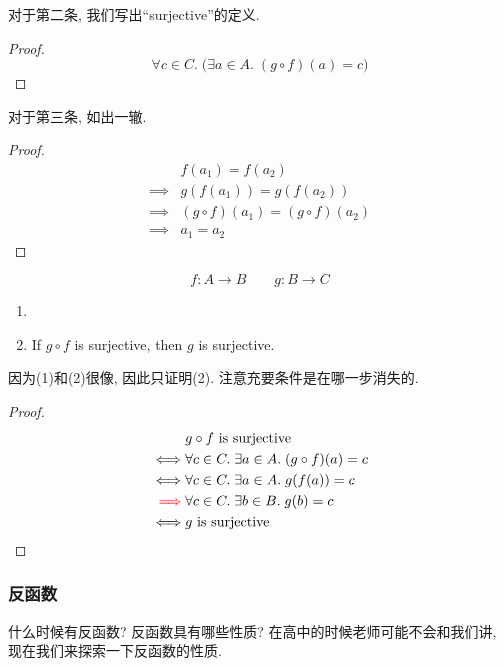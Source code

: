 对于第二条, 我们写出``surjective''的定义. 


\begin{proof}
  $$\forall c \in C.\; \Big( \exists a \in A.\; (g \circ f)(a) = c \Big)$$
\end{proof}

对于第三条, 如出一辙. 

\begin{proof}
  \setcounter{equation}{0}
  \begin{align*}
    &f(a_{1}) = f(a_{2}) \\
    \implies & g(f(a_{1})) = g(f(a_{2})) \\
    \implies & (g \circ f) (a_{1}) = (g \circ f) (a_{2}) \\[6pt]
    \implies & a_{1} = a_{2}
  \end{align*}
\end{proof}

\begin{theorem}[]
  \[
    f: A \to B \qquad g: B \to C
  \]

  \begin{enumerate}
    \item {}
    \item If $g \circ f$ is surjective, then $g$ is surjective.
  \end{enumerate}
\end{theorem}
因为(1)和(2)很像, 因此只证明(2). 注意充要条件是在哪一步消失的. 
\begin{proof}
  \setcounter{equation}{0}
  \begin{align*}
    & g \circ f \text{ is surjective}\\
    \iff & \forall c \in C.\; \exists a \in A.\; (g \circ f)(a) = c \\
    \iff & \forall c \in C.\; \exists a \in A.\; g(f(a)) = c \\
    \textcolor{red}{\implies} & \forall c \in C.\; \exists b \in B.\; g(b) = c \\
    \iff & g \text{ is surjective}
  \end{align*}
\end{proof}

\subsubsection{反函数}

什么时候有反函数? 反函数具有哪些性质? 在高中的时候老师可能不会和我们讲, 现在我们来探索一下反函数的性质. 

